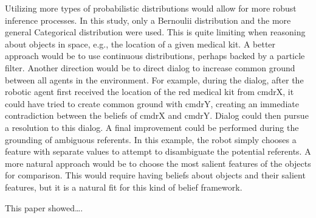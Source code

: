 \documentclass[12pt]{article}
\begin{document}
Utilizing more types of probabilistic distributions would allow for
more robust inference processes. In this study, only a Bernoulii
distribution and the more general Categorical distribution were
used. This is quite limiting when reasoning about objects in space,
e.g., the location of a given medical kit. A better approach would be
to use continuous distributions, perhaps backed by a particle filter.
Another direction would be to direct dialog to increase common
ground between all agents in the environment. For example, during the
dialog, after the robotic agent first received the location of the
red medical kit from cmdrX, it could have tried to create common
ground with cmdrY, creating an immediate contradiction between the
beliefs of cmdrX and cmdrY. Dialog could then pursue a resolution to
this dialog. A final improvement could be performed during the
grounding of ambiguous referents. In this example, the robot simply
chooses a feature with separate values to attempt to disambiguate the
potential referents. A more natural approach would be to choose the
most salient features of the objects for comparison. This would
require having beliefs about objects and their salient features, but
it is a natural fit for this kind of belief framework.

This paper showed\dots.
 {\small }
\end{document}
